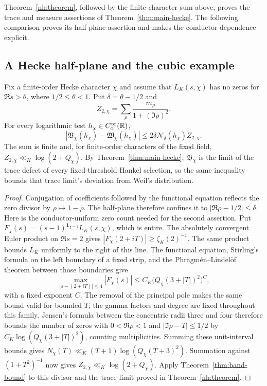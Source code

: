






Theorem~\ref{nh:theorem}, followed by the finite-character sum
above, proves the trace and measure assertions of
Theorem~\ref{thm:main-hecke}. The following comparison proves
its half-plane assertion and makes the conductor dependence explicit.

\subsection{A Hecke half-plane and the cubic example}
\begin{corollary}
\label{cor:hecke-band}
Fix a finite-order Hecke character $\chi$ and assume that
$L_K(s,\chi)$ has no zeros for $\Re s>\theta$, where
$1/2\leq\theta<1$. Put $\delta=\theta-1/2$ and
\[
 Z_{2,\chi}=\sum_\rho\frac{m_\rho}{1+(\Im\rho)^2}.
\]
For every logarithmic test $h_\chi\in C_c^\infty(\mathbb R)$,
\begin{equation}\label{eq:hecke-band}
 |\mathfrak B_\chi(h_\chi)-\mathfrak W_\chi(h_\chi)|
     \leq2\delta\mathcal N_\delta(h_\chi)Z_{2,\chi}.
\end{equation}
The sum is finite and, for finite-order characters of the fixed field,
$Z_{2,\chi}\ll_K\log(2+Q_\chi)$. By
Theorem~\ref{thm:main-hecke}, $\mathfrak B_\chi$ is the limit of
the trace defect of every fixed-threshold Hankel selection, so the same
inequality bounds that trace limit's deviation from Weil's distribution.
\end{corollary}

\begin{proof}
Conjugation of coefficients followed by the functional equation
reflects the zero divisor by $\rho\mapsto1-\overline\rho$. The
half-plane therefore confines it to $|\Re\rho-1/2|\leq\delta$.
Here is the conductor-uniform zero count needed for the second assertion.
Put $F_\chi(s)=(s-1)^{\mathbf1_{\chi=1}}L_K(s,\chi)$, which is
entire. The absolutely convergent Euler product on $\Re s=2$ gives
$|F_\chi(2+iT)|\geq\zeta_K(2)^{-1}$. The same product bounds
$L_K$ uniformly to the right of this line. The functional equation,
Stirling's formula on the left boundary of a fixed strip, and the
Phragm\'en--Lindel\"of theorem between those boundaries give
\[
 \max_{|s-(2+iT)|\leq4}|F_\chi(s)|
                    \leq C_K\bigl(Q_\chi(3+|T|)^2\bigr)^C,
\]
with a fixed exponent $C$. The removal of the principal pole makes
the same bound valid for bounded $T$; the gamma factors and degree
are fixed throughout this family. Jensen's formula between the
concentric radii three and four therefore bounds the number of zeros
with $0<\Re\rho<1$ and $|\Im\rho-T|\leq1/2$ by
$C_K\log(Q_\chi(3+|T|)^2)$, counting multiplicities. Summing these
unit-interval bounds gives
$N_\chi(T)\ll_K(T+1)\log(Q_\chi(T+3)^2)$. Summation against
$(1+T^2)^{-1}$ now gives
$Z_{2,\chi}\ll_K\log(2+Q_\chi)$.
Apply Theorem~\ref{thm:band-bound} to this divisor and the trace
limit proved in Theorem~\ref{nh:theorem}.
\end{proof}

